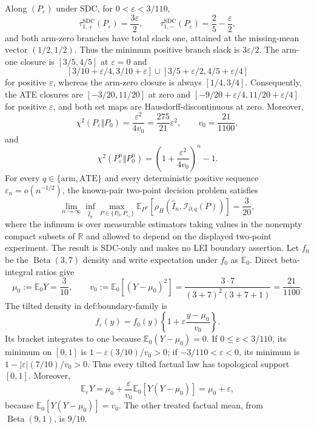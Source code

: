 Along \((P_\varepsilon)\) under SDC, for \(0<\varepsilon<3/110\),
\[
 \tau_{1,+}^{\mathrm{SDC}}(P_\varepsilon)=\frac{3\varepsilon}{2},\qquad
 \tau_{1,-}^{\mathrm{SDC}}(P_\varepsilon)=\frac25-\frac{\varepsilon}{2},
\]
and both arm-zero branches have total slack one, attained at the missing-mean vector \((1/2,1/2)\).  Thus the minimum positive branch slack is \(3\varepsilon/2\).  The arm-one closure is \([3/5,4/5]\) at \(\varepsilon=0\) and
\[
 [3/10+\varepsilon/4,3/10+\varepsilon]
 \mathbin{\cup}[3/5+\varepsilon/2,4/5+\varepsilon/4]
\]
for positive \(\varepsilon\), whereas the arm-zero closure is always \([1/4,3/4]\).  Consequently, the ATE closures are \([-3/20,11/20]\) at zero and \([-9/20+\varepsilon/4,11/20+\varepsilon/4]\) for positive \(\varepsilon\), and both set maps are Hausdorff-discontinuous at zero.  Moreover,
\[
 \chi^2(P_\varepsilon\Vert P_0)=\frac{\varepsilon^2}{4v_0}
 =\frac{275}{21}\varepsilon^2,
 \qquad v_0=\frac{21}{1100},
\]
and
\[
 \chi^2(P_\varepsilon^n\Vert P_0^n)
 =\left(1+\frac{\varepsilon^2}{4v_0}\right)^n-1.
\]
For every \(q\in\{\mathrm{arm},\mathrm{ATE}\}\) and every deterministic positive sequence \(\varepsilon_n=o(n^{-1/2})\), the known-pair two-point decision problem satisfies
\[
 \lim_{n\to\infty}\inf_{\widehat I_n}
 \max_{P\in\{P_0,P_{\varepsilon_n}\}}
 \mathbb E_{P^n}\!\left[
 \rho_H\!\left(\widehat I_n,\mathcal I_{\partial,q}(P)\right)\right]
 =\frac{3}{20},
\]
where the infimum is over measurable estimators taking values in the nonempty compact subsets of \(\mathbb R\) and allowed to depend on the displayed two-point experiment.  The result is SDC-only and makes no LEI boundary assertion.
Let \(f_0\) be the \(\operatorname{Beta}(3,7)\) density and write expectation under \(f_0\) as \(\mathbb E_0\).  Direct beta-integral ratios give
\[
 \mu_0:=\mathbb E_0Y=\frac3{10},\qquad
 v_0:=\mathbb E_0[(Y-\mu_0)^2]
 =\frac{3\cdot7}{(3+7)^2(3+7+1)}=\frac{21}{1100}.                 \tag{22}
\]
The tilted density in \(\text{def:boundary-family}\) is
\[
 f_\varepsilon(y)=f_0(y)\left\{1+\varepsilon\frac{y-\mu_0}{v_0}\right\}.
\]
Its bracket integrates to one because \(\mathbb E_0(Y-\mu_0)=0\).  If \(0\le\varepsilon<3/110\), its minimum on \([0,1]\) is \(1-\varepsilon(3/10)/v_0>0\); if \(-3/110<\varepsilon<0\), its minimum is \(1-|\varepsilon|(7/10)/v_0>0\).  Thus every tilted factual law has topological support \([0,1]\).  Moreover,
\[
 \mathbb E_\varepsilon Y
 =\mu_0+\frac{\varepsilon}{v_0}\mathbb E_0[Y(Y-\mu_0)]
 =\mu_0+\varepsilon,                                             \tag{23}
\]
because \(\mathbb E_0[Y(Y-\mu_0)]=v_0\).  The other treated factual mean, from \(\operatorname{Beta}(9,1)\), is \(9/10\).

